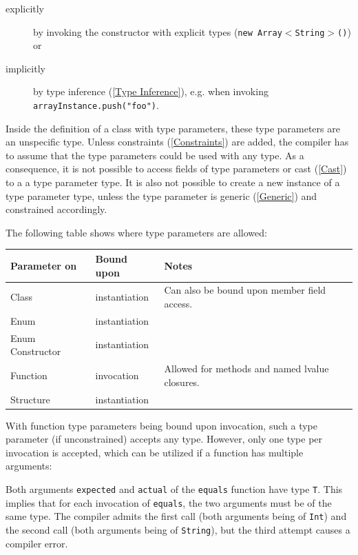 \documentclass{article}
\newcommand{\type}[1]{\texttt{#1}}
\newcommand{\expr}[1]{\texttt{#1}}
\newcommand{\tref}[2]{#1 (\ref{#2})}
\newcommand{\haxe}[2][]{%
}
\begin{document}
\begin{description}
	\item[explicitly] by invoking the constructor with explicit types (\expr{new Array$<$String$>$()}) or
	\item[implicitly] by \tref{type inference}{Type Inference}, e.g. when invoking \expr{arrayInstance.push("foo")}.
\end{description}
Inside the definition of a class with type parameters, these type parameters are an unspecific type. Unless \tref{constraints}{Constraints} are added, the compiler has to assume that the type parameters could be used with any type. As a consequence, it is not possible to access fields of type parameters or \tref{cast}{Cast} to a a type parameter type. It is also not possible to create a new instance of a type parameter type, unless the type parameter is \tref{generic}{Generic} and constrained accordingly. 

The following table shows where type parameters are allowed:

\begin{center}
\begin{tabular}{| l | l | l |}
	\hline
	Parameter on & Bound upon & Notes \\ \hline
	Class & instantiation & Can also be bound upon member field access. \\
	Enum & instantiation & \\
	Enum Constructor & instantiation & \\
	Function & invocation & Allowed for methods and named lvalue closures. \\
	Structure & instantiation & \\ \hline
\end{tabular}
\end{center}
With function type parameters being bound upon invocation, such a type parameter (if unconstrained) accepts any type. However, only one type per invocation is accepted, which can be utilized if a function has multiple arguments:

\haxe{assets/FunctionTypeParameter.hx}

Both arguments \expr{expected} and \expr{actual} of the \expr{equals} function have type \type{T}. This implies that for each invocation of \expr{equals}, the two arguments must be of the same type. The compiler admits the first call (both arguments being of \type{Int}) and the second call (both arguments being of \type{String}), but the third attempt causes a compiler error.
\end{document}
